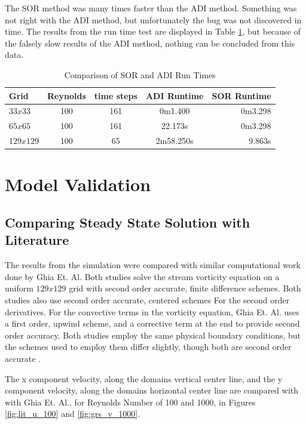 The SOR method was many times faster than the ADI method.  Something was not right with the ADI method, but unfortunately the bug was not discovered in time.  The results from the run time test are displayed in Table \ref{tab:sor_vs_adi}, but because of the falsely slow results of the ADI method, nothing can be concluded from this data.


\begin{table}
\center
\caption{Comparison of SOR and ADI Run Times}
\label{tab:sor_vs_adi}

\begin{tabular}{l c c c r}
\hline
Grid & Reynolds & time steps & ADI Runtime & SOR Runtime \\
\hline 
\hline 
$33x33$   & 100 & 161 & 0m1.400   & 0m3.298 \\
$65x65$   & 100 & 161 & 22.173s   & 0m3.298 \\
$129x129$ & 100 & 65  & 2m58.250s & 9.863s  \\
\hline  
\end{tabular}
\end{table}


\section{Model Validation}
\label{sec:mod_vald}



	\subsection{Comparing Steady State Solution with Literature}
	\label{sec:lit_comp}
The results from the simulation were compared with similar computational work done by Ghia Et. Al.  Both studies solve the stream vorticity equation on a uniform $129x129$ grid with second order accurate, finite difference schemes.  Both studies also use second order accurate, centered schemes For the second order derivatives.  For the convective terms in the vorticity equation, Ghia Et. Al. uses a first order, upwind scheme, and a corrective term at the end to provide second order accuracy.  Both studies employ the same physical boundary conditions, but the schemes used to employ them differ slightly, though both are second order accurate \cite{Ghia1982}.

The x component velocity, along the domains vertical center line, and the y component velocity, along the domains horizontal center line are compared with with Ghia Et. Al., for Reynolds Number of 100 and 1000, in Figures \ref{fig:lit_u_100} and \ref{fig:grs_v_1000}.

